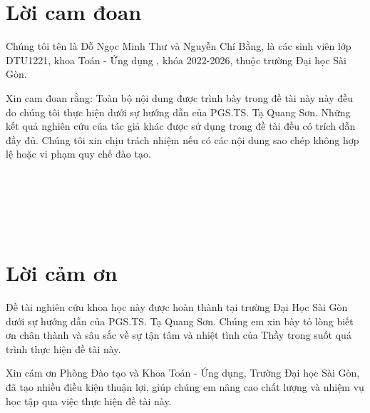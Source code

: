 \documentclass[12pt,a4paper]{report}
\begin{document}
	\renewcommand{\baselinestretch}{1.2}
	\fontsize{13pt}{20pt}\selectfont
	
	\chapter*{Lời cam đoan}
	\thispagestyle{fancy}
	\vspace{1cm}
	\indent
	
	Chúng tôi tên là Đỗ Ngọc Minh Thư và Nguyễn Chí Bằng, là các  sinh viên lớp DTU1221, khoa Toán - Ứng dụng , khóa 2022-2026,  thuộc trường Đại học Sài Gòn. 
	
	Xin cam đoan rằng: Toàn bộ nội dung được trình bày trong đề tài  này này đều do chúng tôi thực hiện dưới sự hướng dẫn của PGS.TS. Tạ Quang Sơn.
	Những kết quả nghiên cứu của tác giả khác được sử dụng trong đề tài  đều có trích dẫn đầy đủ. 
	Chúng tôi xin chịu trách nhiệm nếu có các nội dung sao chép không hợp lệ hoặc vi phạm quy chế đào tạo. 
	\\
	\\
	\\
	\\
	\\
	\\
	
	
	\chapter*{Lời cảm ơn}
	\thispagestyle{fancy}
	\vspace{1cm}
	\indent
	
	Đề tài nghiên cứu khoa học này được hoàn thành tại trường Đại Học Sài Gòn dưới sự hướng dẫn của PGS.TS. Tạ Quang Sơn.   Chúng em xin bày tỏ lòng biết ơn chân thành và sâu sắc về sự tận tâm và nhiệt tình của Thầy trong suốt quá trình thực hiện đề tài này.
	
	
	\bigskip
	Xin cám ơn Phòng Đào tạo  và Khoa Toán - Ứng dụng, Trường Đại học Sài Gòn, đã tạo nhiều điều kiện thuận lợi, giúp chúng em nâng cao chất lượng và nhiệm vụ học tập qua việc thực hiện đề tài này.
	\\
	\\
	\\
	\\
	\\
	
\end{document}
